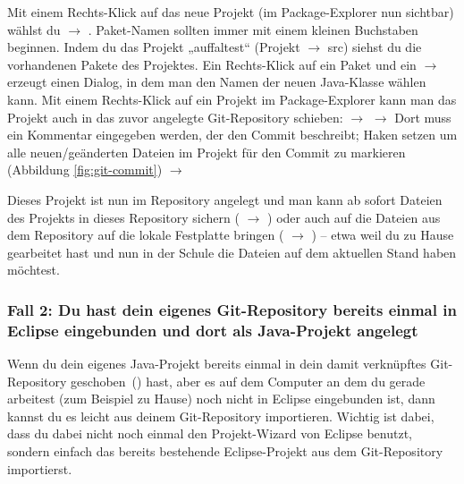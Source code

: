 \afterpage{\clearpage}

Mit einem Rechts-Klick auf das neue Projekt (im Package-Explorer nun sichtbar)
wählst du  $\rightarrow$ . Paket-Namen sollten immer
mit einem kleinen Buchstaben beginnen. Indem du das Projekt „auffaltest“
(Projekt $\rightarrow$ src) siehst du die vorhandenen Pakete des Projektes. Ein
Rechts-Klick auf ein Paket und ein  $\rightarrow$ 
erzeugt einen Dialog, in dem man den Namen der neuen Java-Klasse wählen kann.
Mit einem Rechts-Klick auf ein Projekt im Package-Explorer kann man das Projekt
auch in das zuvor angelegte Git-Repository schieben: 
$\rightarrow$  $\rightarrow$ Dort muss ein Kommentar
eingegeben werden, der den Commit beschreibt; Haken setzen um alle
neuen/geänderten Dateien im Projekt für den Commit zu markieren (Abbildung
\ref{fig:git-commit}) $\rightarrow$ 

Dieses Projekt ist nun im Repository angelegt und man kann ab sofort Dateien des
Projekts in dieses Repository sichern ( $\rightarrow$
) oder auch auf die Dateien aus dem Repository auf die
lokale Festplatte bringen ( $\rightarrow$ )
-- etwa weil du zu Hause gearbeitet hast und nun in der Schule die Dateien auf
dem aktuellen Stand haben möchtest.

\subsubsection{Fall 2: Du hast dein eigenes Git-Repository bereits einmal in
Eclipse eingebunden und dort als Java-Projekt angelegt}

Wenn du dein eigenes Java-Projekt bereits einmal in dein damit
verknüpftes Git-Repository \glqq geschoben\grqq\ () hast,
aber es auf dem Computer an dem du gerade arbeitest (zum Beispiel zu Hause) noch
nicht in Eclipse eingebunden ist, dann kannst du es leicht aus deinem
Git-Repository importieren. Wichtig ist dabei, dass du dabei nicht noch einmal
den Projekt-Wizard von Eclipse benutzt, sondern einfach das bereits bestehende
Eclipse-Projekt aus dem Git-Repository importierst. 

